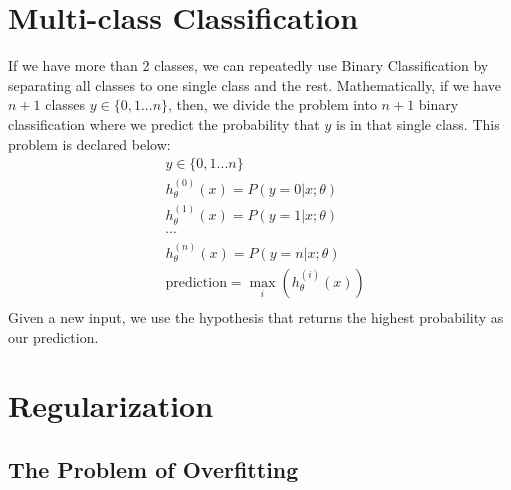\section{Multi-class Classification}
If we have more than 2 classes, we can repeatedly use Binary Classification by separating all classes to one single class and the rest. Mathematically, if we have $n + 1$ classes $y \in \lbrace0, 1 ... n\rbrace$, then, we divide the problem into $n+1$ binary classification where we predict the probability that $y$ is in that single class. This problem is declared below:
\begin{align*}
& y \in \lbrace0, 1 ... n\rbrace \\
& h_\theta^{(0)}(x) = P(y = 0 | x ; \theta) \\
& h_\theta^{(1)}(x) = P(y = 1 | x ; \theta) \\
& \cdots \\
& h_\theta^{(n)}(x) = P(y = n | x ; \theta) \\
& \mathrm{prediction} = \max_i( h_\theta ^{(i)}(x) )\\
\end{align*}
Given a new input, we use the hypothesis that returns the highest probability as our prediction.

\section{Regularization}
\subsection{The Problem of Overfitting}
